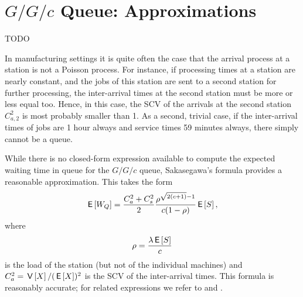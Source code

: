 \section{$G/G/c$ Queue: Approximations}
\label{sec:gg1}


TODO




In manufacturing settings it is quite often the case that the arrival process at a station is not a Poisson process.
For instance, if processing times at a station are nearly constant, and the jobs of this station are sent to a second station for further processing, the inter-arrival times at the second station must be more or less equal too.
Hence, in this case, the SCV of the arrivals at the second station $C_{a,2}^2$ is most probably smaller than 1.
As a second, trivial case, if the inter-arrival times of jobs are 1 hour always and service times 59 minutes always, there simply cannot be a queue.

While there is no closed-form expression available to compute the expected waiting time in queue for the $G/G/c$ queue, Sakasegawa's formula provides a reasonable approximation. This takes the form
\begin{equation}\label{eq:7}
 \,\mathsf{E}\left[W_Q\right] = \frac{C_a^2+C_s^2}2 \frac{\rho^{\sqrt{2(c+1)}-1}}{c(1-\rho)} \,\mathsf{E}\left[S\right],
\end{equation}
where
\begin{equation*}
 \rho = \frac{\lambda \,\mathsf{E}\left[S\right]}{c}
\end{equation*}
is the load of the station (but not of the individual machines) and $C_a^2 = \,\mathsf{V}\left[X\right]/(\,\mathsf{E}\left[X\right])^2$ is the SCV of the inter-arrival times.
This formula is reasonably accurate; for related expressions we refer to \citet{bolch06:_queuein_networ_markov_chain} and \citet{hall91:_queuein_method_servic_manuf}.


